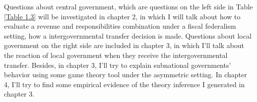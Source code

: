 Questions about central government, which are questions on the left side in Table \ref*{Table 1.3} will be investigated in chapter 2, in which I will talk about how to evaluate a revenue and responsibilities combination under a fiscal federalism setting, how a intergovernmental transfer decision is made. Questions about local government on the right side are included in chapter 3, in which I'll talk about the reaction of local government when they receive the intergovernmental transfer. Besides, in chapter 3, I'll try to explain subnational governments' behavior using some game theory tool under the asymmetric setting. In chapter 4, I'll try to find some empirical evidence of the theory inference I generated in chapter 3.






